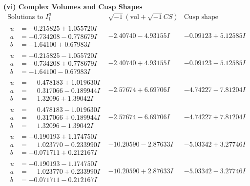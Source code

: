\documentclass[1p]{elsarticle_modified}
\theoremstyle{definition}
\newcommand{\I}{\sqrt{-1}}
\begin{document}
\newpage\flushleft \textbf{(vi) Complex Volumes and Cusp Shapes}
$$\begin{array}{c|c|c}  
\text{Solutions to }I^u_{1}& \I (\text{vol} + \sqrt{-1}CS) & \text{Cusp shape}\\
 \hline 
\begin{aligned}
u &= -0.215825 + 1.055720 I \\
a &= -0.734208 - 0.778679 I \\
b &= -1.64100 + 0.67983 I\end{aligned}
 & -2.40740 - 4.93155 I & -0.09123 + 5.12585 I \\ \hline\begin{aligned}
u &= -0.215825 - 1.055720 I \\
a &= -0.734208 + 0.778679 I \\
b &= -1.64100 - 0.67983 I\end{aligned}
 & -2.40740 + 4.93155 I & -0.09123 - 5.12585 I \\ \hline\begin{aligned}
u &= \phantom{-}0.478183 + 1.019630 I \\
a &= \phantom{-}0.317066 - 0.189944 I \\
b &= \phantom{-}1.32096 + 1.39042 I\end{aligned}
 & -2.57674 + 6.69706 I & -4.74227 - 7.81204 I \\ \hline\begin{aligned}
u &= \phantom{-}0.478183 - 1.019630 I \\
a &= \phantom{-}0.317066 + 0.189944 I \\
b &= \phantom{-}1.32096 - 1.39042 I\end{aligned}
 & -2.57674 - 6.69706 I & -4.74227 + 7.81204 I \\ \hline\begin{aligned}
u &= -0.190193 + 1.174750 I \\
a &= \phantom{-}1.023770 - 0.233990 I \\
b &= -0.071711 + 0.212167 I\end{aligned}
 & -10.20590 - 2.87633 I & -5.03342 + 3.27746 I \\ \hline\begin{aligned}
u &= -0.190193 - 1.174750 I \\
a &= \phantom{-}1.023770 + 0.233990 I \\
b &= -0.071711 - 0.212167 I\end{aligned}
 & -10.20590 + 2.87633 I & -5.03342 - 3.27746 I \\ \hline\begin{aligned}

\end{aligned}
\end{array}$$
\end{document}
